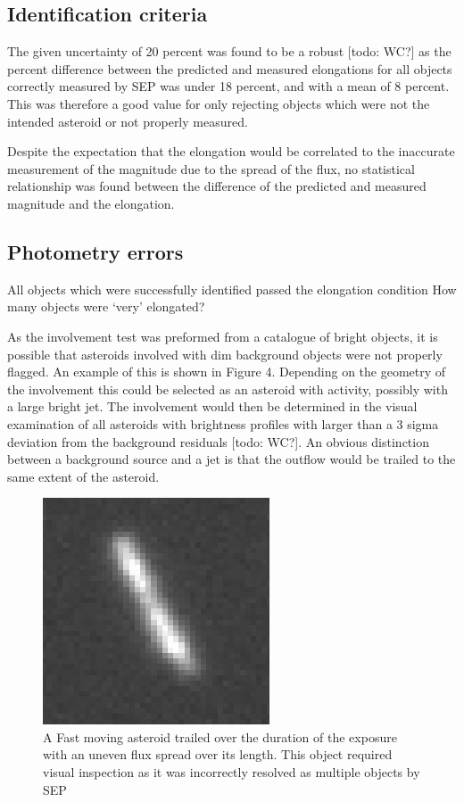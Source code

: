 \documentclass[iop,apj]{emulateapj}
\begin{document}
\subsection{Identification criteria}

The given uncertainty of 20 percent was found to be a robust [todo: WC?] as the percent difference between the predicted and measured elongations for all objects correctly measured by SEP was under 18 percent, and with a mean of 8 percent. This was therefore a good value for only rejecting objects which were not the intended asteroid or not properly measured.

Despite the expectation that the elongation would be correlated to the inaccurate measurement of the magnitude due to the spread of the flux, no statistical relationship was found between the difference of the predicted and measured magnitude and the elongation.

\subsection{Photometry errors}



All objects which were successfully identified passed the elongation condition
How many objects were `very' elongated?


As the involvement test was preformed from a catalogue of bright objects, it is possible that asteroids involved with dim background objects were not properly flagged. An example of this is shown in Figure 4. Depending on the geometry of the involvement this could be selected as an asteroid with activity, possibly with a large bright jet. The involvement would then be determined in the visual examination of all asteroids with brightness profiles with larger than a 3 sigma deviation from the background residuals [todo: WC?]. An obvious distinction between a background source and a jet is that the outflow would be trailed to the same extent of the asteroid.

\begin{figure}[!htb]
    \centering
    \includegraphics[width=0.4\linewidth]{images/flux_spread.png}
    \caption{A Fast moving asteroid trailed over the duration of the exposure with an uneven flux spread over its length. This object required visual inspection as  it was incorrectly resolved as multiple objects by SEP}\label{fig:4}
\end{figure}
\end{document}
